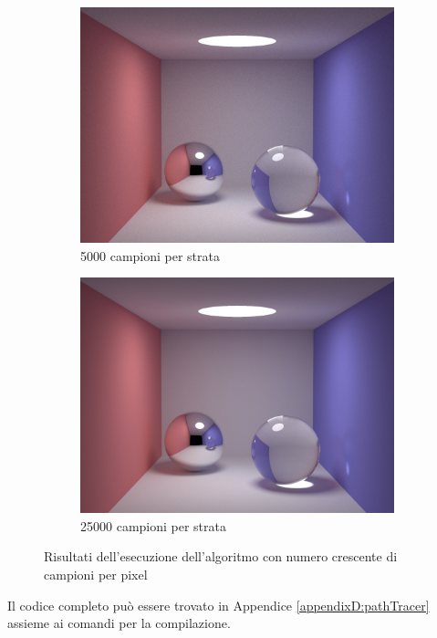 \begin{figure}[tb]
\begin{subfigure}[c]{0.4\linewidth}
	\includegraphics[width=\linewidth]{../assets/appendixD_result_5k.png}
	\caption{5000 campioni per strata}
    \end{subfigure}\hfill
    \begin{subfigure}[c]{0.4\linewidth}
	\centering
	\includegraphics[width=\linewidth]{../assets/appendixD_result_25k.png}
	\caption{25000 campioni per strata}
    \end{subfigure}
    \caption{Risultati dell'esecuzione dell'algoritmo con numero crescente di campioni per pixel}
\end{figure}
Il codice completo pu\`o essere trovato in Appendice \ref{appendixD:pathTracer} assieme ai comandi per la compilazione.
